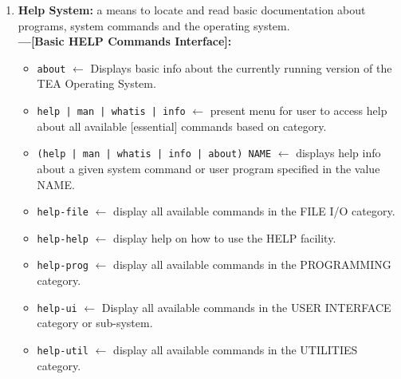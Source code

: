 \documentclass{article}
\begin{document}
\begin{enumerate}
{\begin{itemize}
\item \texttt{username NAME} $\leftarrow$ Overrides current username with specified value.


\item \texttt{(whoami|name)} $\leftarrow$ Display the NAME of currently active USER.

\end{itemize}

}



\item {  \textbf{Help System:} a means to locate and read basic documentation about programs, system commands and the operating system.\\
\textbf{---[Basic HELP Commands Interface]:}
\begin{itemize}
\item \texttt{about} $\leftarrow$ Displays basic info about the currently running version of the TEA Operating System.
\item \texttt{help | man | whatis | info} $\leftarrow$ present menu for user to access help about all available [essential] commands based on category.
\item \texttt{(help | man | whatis | info | about) NAME} $\leftarrow$ displays help info about a given system command or user program specified in the value NAME.

\item \texttt{help-file} $\leftarrow$ display all available commands in the FILE I/O category.
\item \texttt{help-help} $\leftarrow$ display help on how to use the HELP facility.

\item \texttt{help-prog} $\leftarrow$ display all available commands in the PROGRAMMING category.

\item \texttt{help-ui} $\leftarrow$ Display all available commands in the USER INTERFACE category or sub-system.

\item \texttt{help-util} $\leftarrow$ display all available commands in the UTILITIES category.


\end{itemize}

}


\end{enumerate}


\vspace{2em}
\end{document}
